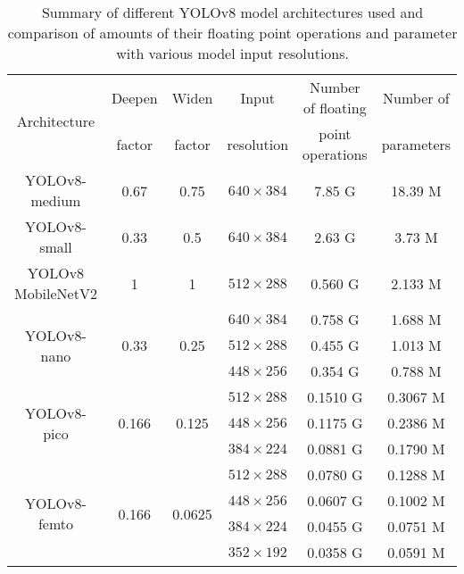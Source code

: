 
\begin{table}[h]
\centering
\small
\begin{tabular}{|c|c|c|c|c|c|}
    \hline
    \multirow{2}{*}{Architecture}& Deepen                 & Widen                   & Input      & Number of floating & Number of \\
                                 & factor                 & factor                  & resolution & point operations   & parameters \\
    \hline
    \hline
    YOLOv8-medium                & 0.67                   & 0.75                    & $640 \times 384$ & 7.85 G & 18.39 M \\
    \hline
    YOLOv8-small                 & 0.33                   & 0.5                     & $640 \times 384$ & 2.63 G & 3.73 M \\
    \hline
    YOLOv8 MobileNetV2           & 1                      & 1                       & $512 \times 288$ & 0.560 G & 2.133 M \\
    \hline
    \multirow{3}{*}{YOLOv8-nano} & \multirow{3}{*}{0.33}  & \multirow{3}{*}{0.25}   & $640 \times 384$ & 0.758 G & 1.688 M \\
                                 &                        &                         & $512 \times 288$ & 0.455 G & 1.013 M \\
                                 &                        &                         & $448 \times 256$ & 0.354 G & 0.788 M \\
    \hline
    \multirow{3}{*}{YOLOv8-pico} & \multirow{3}{*}{0.166} & \multirow{3}{*}{0.125}  & $512 \times 288$ & 0.1510 G & 0.3067 M \\
                                 &                        &                         & $448 \times 256$ & 0.1175 G & 0.2386 M \\
                                 &                        &                         & $384 \times 224$ & 0.0881 G & 0.1790 M \\
    \hline
    \multirow{4}{*}{YOLOv8-femto}& \multirow{4}{*}{0.166} & \multirow{4}{*}{0.0625} & $512 \times 288$ & 0.0780 G & 0.1288 M \\
                                 &                        &                         & $448 \times 256$ & 0.0607 G & 0.1002 M \\
                                 &                        &                         & $384 \times 224$ & 0.0455 G & 0.0751 M \\
                                 &                        &                         & $352 \times 192$ & 0.0358 G & 0.0591 M \\
    \hline
\end{tabular}
\caption{Summary of different YOLOv8 model architectures used and comparison of amounts of their floating point operations and parameter with various model input resolutions.}
\label{ModelArchitectures}
\end{table}



